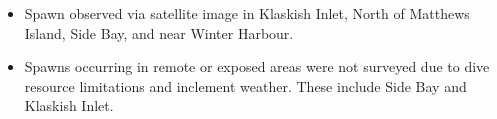 \begin{itemize}

\item Spawn observed via satellite image in Klaskish Inlet,
North of Matthews Island, Side Bay, and near Winter Harbour.

\item Spawns occurring in remote or exposed areas were not surveyed
due to dive resource limitations and inclement weather.
These include Side Bay and Klaskish Inlet.

\end{itemize}
